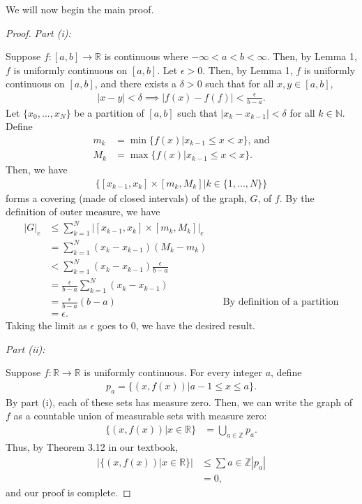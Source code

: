 \documentclass[10pt,a4paper]{article}
\makeatletter
\theoremstyle{theorem}
\newcommand{\proofpart}[2]{%
  \par
  \addvspace{\medskipamount}%
  \noindent\emph{Part #1: #2}\par\nobreak
  \addvspace{\smallskipamount}%
  \@afterheading
}
\theoremstyle{definition}
\makeatother
\begin{document}
We will now begin the main proof.
\begin{proof}
\proofpart{(i)}{}
Suppose $f:[a,b] \to \mathbb{R}$ is continuous where $-\infty < a < b < \infty$. Then, by Lemma 1, $f$ is uniformly continuous on $[a, b]$. Let $\epsilon > 0$. Then, by Lemma 1, $f$ is uniformly continuous on $[a, b]$, and there exists a $\delta > 0$ such that for all $x, y \in [a, b]$,
\begin{align*}
|x - y| < \delta \implies |f(x) - f(f)| < \frac{\epsilon}{b - a}.
\end{align*}
Let $\{x_0, ..., x_N\}$ be a partition of $[a, b]$ such that $|x_k - x_{k-1}| < \delta$ for all $k \in \mathbb{N}$. Define 
\begin{align*}
m_k &= \min\{f(x)| x_{k-1} \leq x < x\} \text{, and}\\
M_k &= \max\{f(x)| x_{k-1} \leq x < x\}.
\end{align*}
Then, we have
\begin{align*}
\{[x_{k-1}, x_k] \times [m_k, M_k] | k \in \{1, ..., N\} \}
\end{align*}
forms a covering (made of closed intervals) of the graph, $G$, of $f$. By the definition of outer measure, we have
\begin{align*}
|G|_e &\leq \sum_{k=1}^N |[x_{k-1}, x_k] \times [m_k, M_k]|_e\\
&= \sum_{k=1}^N (x_k - x_{k - 1}) (M_k - m_k)\\
&< \sum_{k=1}^N (x_k - x_{k - 1})\frac{\epsilon}{b - a} \\
&= \frac{\epsilon}{b - a}\sum_{k=1}^N (x_k - x_{k - 1})\\
&= \frac{\epsilon}{b - a} (b - a) &&\text{By definition of a partition}\\
&= \epsilon. 
\end{align*}
Taking the limit as $\epsilon$ goes to $0$, we have the desired result.
\proofpart{(ii)}{}
Suppose $f:\mathbb{R} \to \mathbb{R}$ is uniformly continuous. For every integer $a$, define 
\begin{align*}
p_a = \{(x, f(x))| a-1 \leq x \leq a\}.
\end{align*}
By part (i), each of these sets has measure zero. Then, we can write the graph of $f$ as a countable union of measurable sets with measure zero:
\begin{align*}
\{(x, f(x)) | x \in \mathbb{R} \} &= \bigcup_{a \in \mathbb{Z}} p_a.
\end{align*}
Thus, by Theorem 3.12 in our textbook,
\begin{align*}
|\{(x, f(x) )| x \in \mathbb{R} \}| &\leq \sum{a \in \mathbb{Z}} |p_a|\\
&= 0,
\end{align*}
and our proof is complete.
\end{proof}
\end{document}
